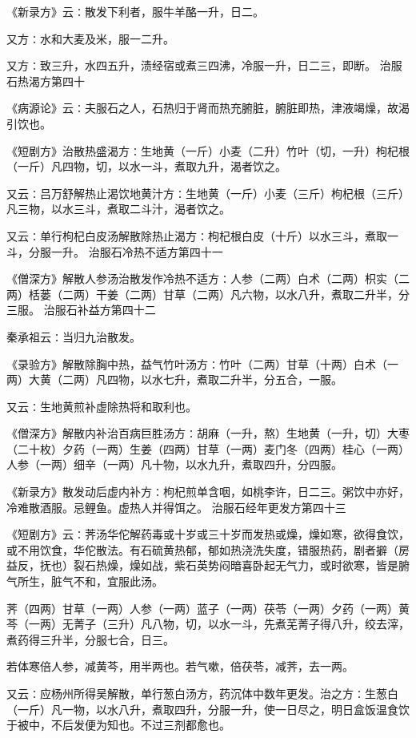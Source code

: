 \documentclass[a4paper,12pt,UTF8,twoside]{ctexbook}
\begin{document}
《新录方》云∶散发下利者，服牛羊酪一升，日二。

又方∶水和大麦及米，服一二升。

又方∶致三升，水四五升，渍经宿或煮三四沸，冷服一升，日二三，即断。
治服石热渴方第四十

《病源论》云∶夫服石之人，石热归于肾而热充腑脏，腑脏即热，津液竭燥，故渴引饮也。

《短剧方》治散热盛渴方∶生地黄（一斤）小麦（二升）竹叶（切，一升）枸杞根（一斤）凡四物，切，以水一斗，煮取九升，渴者饮之。

又云∶吕万舒解热止渴饮地黄汁方∶生地黄（一斤）小麦（三斤）枸杞根（三斤）凡三物，以水三斗，煮取二斗汁，渴者饮之。

又云∶单行枸杞白皮汤解散除热止渴方∶枸杞根白皮（十斤）以水三斗，煮取一斗，分服一升。
治服石冷热不适方第四十一

《僧深方》解散人参汤治散发作冷热不适方∶人参（二两）白术（二两）枳实（二两）栝蒌（二两）干姜（二两）甘草（二两）凡六物，以水八升，煮取二升半，分三服。
治服石补益方第四十二

秦承祖云∶当归九治散发。

《录验方》解散除胸中热，益气竹叶汤方∶竹叶（二两）甘草（十两）白术（一两）大黄（二两）凡四物，以水七升，煮取二升半，分五合，一服。

又云∶生地黄煎补虚除热将和取利也。

《僧深方》解散内补治百病巨胜汤方∶胡麻（一升，熬）生地黄（一升，切）大枣（二十枚）夕药（一两）生姜（四两）甘草（一两）麦门冬（四两）桂心（一两）人参（一两）细辛（一两）凡十物，以水九升，煮取四升，分四服。

《新录方》散发动后虚内补方∶枸杞煎单含咽，如桃李许，日二三。粥饮中亦好，冷难散酒服。忌鲤鱼。虚热人并得饵之。
治服石经年更发方第四十三

《短剧方》云∶荠汤华佗解药毒或十岁或三十岁而发热或燥，燥如寒，欲得食饮，或不用饮食，华佗散法。有石硫黄热郁，郁如热浇洗失度，错服热药，剧者擗（房益反，抚也）裂石热燥，燥如战，紫石英势闷暗喜卧起无气力，或时欲寒，皆是腑气所生，脏气不和，宜服此汤。

荠（四两）甘草（一两）人参（一两）蓝子（一两）茯苓（一两）夕药（一两）黄芩（一两）无菁子（三升）凡八物，切，以水一斗，先煮芜菁子得八升，绞去滓，煮药得三升半，分服七合，日三。

若体寒倍人参，减黄芩，用半两也。若气嗽，倍茯苓，减荠，去一两。

又云∶应杨州所得吴解散，单行葱白汤方，药沉体中数年更发。治之方∶生葱白（一斤）凡一物，以水八升，煮取四升，分服一升，使一日尽之，明日盒饭温食饮于被中，不后发便为知也。不过三剂都愈也。
\end{document}
